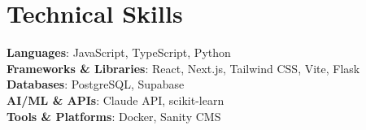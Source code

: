\documentclass[letterpaper,10.5pt]{article}
\begin{document}
\section{Technical Skills}
 \begin{itemize}[leftmargin=0.15in, label={}]
    \normalsize{\item{
     \textbf{Languages}: JavaScript, TypeScript, Python \\
     \textbf{Frameworks \& Libraries}: React, Next.js, Tailwind CSS, Vite, Flask \\
     \textbf{Databases}: PostgreSQL, Supabase \\
     \textbf{AI/ML \& APIs}: Claude API, scikit-learn \\
     \textbf{Tools \& Platforms}: Docker, Sanity CMS
    }}
 \end{itemize}
\end{document}
